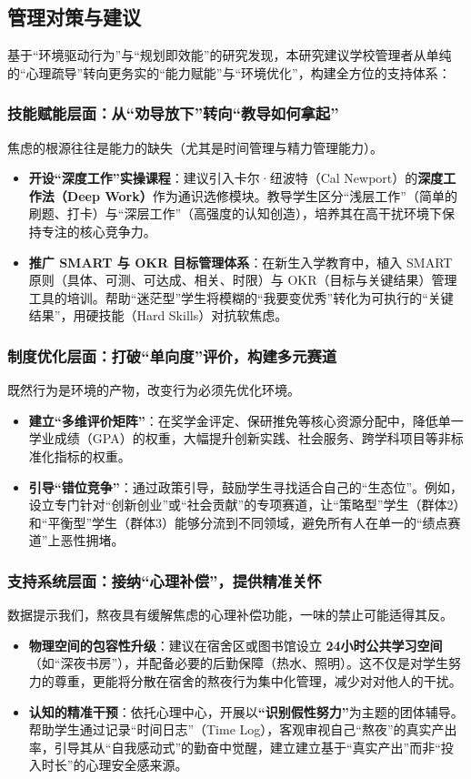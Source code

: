 \documentclass[win,thesis]{hustreport} %
\begin{document}
\subsection{管理对策与建议}
基于“环境驱动行为”与“规划即效能”的研究发现，本研究建议学校管理者从单纯的“心理疏导”转向更务实的“能力赋能”与“环境优化”，构建全方位的支持体系：

\subsubsection{技能赋能层面：从“劝导放下”转向“教导如何拿起”}
焦虑的根源往往是能力的缺失（尤其是时间管理与精力管理能力）。
\begin{itemize}
	\item \textbf{开设“深度工作”实操课程}：建议引入卡尔·纽波特（Cal Newport）的\textbf{深度工作法（Deep Work）}作为通识选修模块。教导学生区分“浅层工作”（简单的刷题、打卡）与“深层工作”（高强度的认知创造），培养其在高干扰环境下保持专注的核心竞争力。
	\item \textbf{推广 SMART 与 OKR 目标管理体系}：在新生入学教育中，植入 SMART 原则（具体、可测、可达成、相关、时限）与 OKR（目标与关键结果）管理工具的培训。帮助“迷茫型”学生将模糊的“我要变优秀”转化为可执行的“关键结果”，用硬技能（Hard Skills）对抗软焦虑。
\end{itemize}

\subsubsection{制度优化层面：打破“单向度”评价，构建多元赛道}
既然行为是环境的产物，改变行为必须先优化环境。
\begin{itemize}
	\item \textbf{建立“多维评价矩阵”}：在奖学金评定、保研推免等核心资源分配中，降低单一学业成绩（GPA）的权重，大幅提升创新实践、社会服务、跨学科项目等非标准化指标的权重。
	\item \textbf{引导“错位竞争”}：通过政策引导，鼓励学生寻找适合自己的“生态位”。例如，设立专门针对“创新创业”或“社会贡献”的专项赛道，让“策略型”学生（群体2）和“平衡型”学生（群体3）能够分流到不同领域，避免所有人在单一的“绩点赛道”上恶性拥堵。
\end{itemize}

\subsubsection{支持系统层面：接纳“心理补偿”，提供精准关怀}
数据提示我们，熬夜具有缓解焦虑的心理补偿功能，一味的禁止可能适得其反。
\begin{itemize}
	\item \textbf{物理空间的包容性升级}：建议在宿舍区或图书馆设立 \textbf{24小时公共学习空间}（如“深夜书房”），并配备必要的后勤保障（热水、照明）。这不仅是对学生努力的尊重，更能将分散在宿舍的熬夜行为集中化管理，减少对对他人的干扰。
	\item \textbf{认知的精准干预}：依托心理中心，开展以\textbf{“识别假性努力”}为主题的团体辅导。帮助学生通过记录“时间日志”（Time Log），客观审视自己“熬夜”的真实产出率，引导其从“自我感动式”的勤奋中觉醒，建立建立基于“真实产出”而非“投入时长”的心理安全感来源。
\end{itemize}
\end{document}
